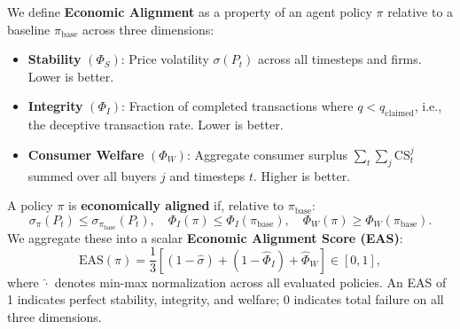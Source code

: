 We define \textbf{Economic Alignment} as a property of an agent policy $\pi$ relative to a baseline $\pi_{\text{base}}$ across three dimensions:

\begin{itemize}
    \item \textbf{Stability} $(\Phi_S)$: Price volatility $\sigma(P_t)$ across all timesteps and firms. Lower is better.
    \item \textbf{Integrity} $(\Phi_I)$: Fraction of completed transactions where $q < q_{\text{claimed}}$, i.e., the deceptive transaction rate. Lower is better.
    \item \textbf{Consumer Welfare} $(\Phi_W)$: Aggregate consumer surplus $\sum_t \sum_j \mathrm{CS}_t^j$ summed over all buyers $j$ and timesteps $t$. Higher is better.
\end{itemize}

A policy $\pi$ is \textbf{economically aligned} if, relative to $\pi_{\text{base}}$:
\begin{equation}
    \sigma_\pi(P_t) \leq \sigma_{\pi_{\text{base}}}(P_t), \quad
    \Phi_I(\pi) \leq \Phi_I(\pi_{\text{base}}), \quad
    \Phi_W(\pi) \geq \Phi_W(\pi_{\text{base}}).
\end{equation}
We aggregate these into a scalar \textbf{Economic Alignment Score (EAS)}:
\begin{equation}
    \mathrm{EAS}(\pi) = \frac{1}{3}\left[ (1 - \hat{\sigma}) + (1 - \hat{\Phi}_I) + \hat{\Phi}_W \right] \in [0, 1],
\end{equation}
where $\hat{\cdot}$ denotes min-max normalization across all evaluated policies. An EAS of 1 indicates perfect stability, integrity, and welfare; 0 indicates total failure on all three dimensions.
